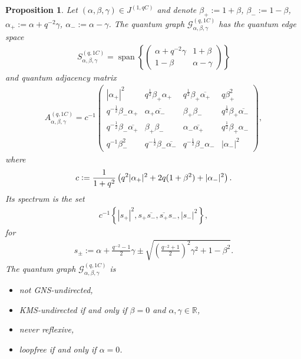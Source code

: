 \documentclass{amsart}
\newtheorem{proposition}[thm]{Proposition}
\newcommand{\R}{\mathbb{R}}
\DeclareMathOperator{\spann}{span}
\begin{document}
\begin{proposition}
    \label{ntg::prop:qgraph_G_alpha,beta,gamma_with_one_edge}
    Let $(\alpha,\beta,\gamma)\in J^{(1,qC)}$ and denote $\beta_+ := 1+\beta$, $\beta_- := 1 - \beta$, $\alpha_+ := \alpha+q^{-2}\gamma$, $\alpha_- := \alpha-\gamma$.
    The quantum graph $\mathcal{G}_{\alpha,\beta,\gamma}^{(q,1C)}$ has the quantum edge space
    \begin{align*}
        S_{\alpha,\beta,\gamma}^{(q,1C)} = \spann\left\{ \begin{pmatrix}
            \alpha + q^{-2} \gamma & 1 + \beta \\
            1-\beta & \alpha - \gamma
        \end{pmatrix} \right\}
    \end{align*}
    and quantum adjacency matrix 
    \begin{align*}
        A_{\alpha,\beta,\gamma}^{(q,1C)} = c^{-1} \begin{pmatrix}
            |\alpha_+|^2     & q^{\frac{1}{2}} \beta_+ \alpha_+            & q^{\frac{1}{2}}\beta_+ \overline{\alpha_+}              & q \beta_+^2            \\
            q^{-\frac{1}{2}} \beta_- \alpha_+ & \alpha_+ \overline{\alpha_-} & \beta_+ \beta_-                           & q^{\frac{1}{2}}\beta_+ \overline{\alpha_-}   \\
            q^{-\frac{1}{2}}\beta_- \overline{\alpha_+} & \beta_+ \beta_-                          & \alpha_- \overline{\alpha_+}   & q^{\frac{1}{2}}\beta_+ \alpha_-   \\
            q^{-1}\beta_-^2         & q^{-\frac{1}{2}}\beta_- \overline{\alpha_-}            & q^{-\frac{1}{2}} \beta_- \alpha_-              & |\alpha_-|^2        
        \end{pmatrix},
    \end{align*}
    where
    \begin{align*}
        c \vcentcolon= \frac{1}{1+q^2} \left( q^2 |\alpha_+|^2 + 2q (1+\beta^2) + |\alpha_-|^2 \right).
    \end{align*}
    Its spectrum is the set
    \begin{align*}
        c^{-1} \left\{ |s_+|^2, s_+ \overline{s_-}, \overline{s_+} s_-, |s_-|^2\right\},
    \end{align*}
    for
    \begin{align*}
        s_{\pm} := %
            \alpha + \frac{q^{-2}-1}{2} \gamma \pm \sqrt{\left(\frac{q^{-2}+1}{2}\right)^2\gamma^2 + 1-\beta^2}.
    \end{align*}
    The quantum graph $\mathcal{G}_{\alpha,\beta,\gamma}^{(q,1C)}$ is 
    \begin{itemize}
        \item not GNS-undirected,
        \item KMS-undirected if and only if $\beta = 0$ and $\alpha, \gamma \in \R$,
        \item never reflexive,
        \item loopfree if and only if $\alpha = 0$.
    \end{itemize}
\end{proposition}
\end{document}
